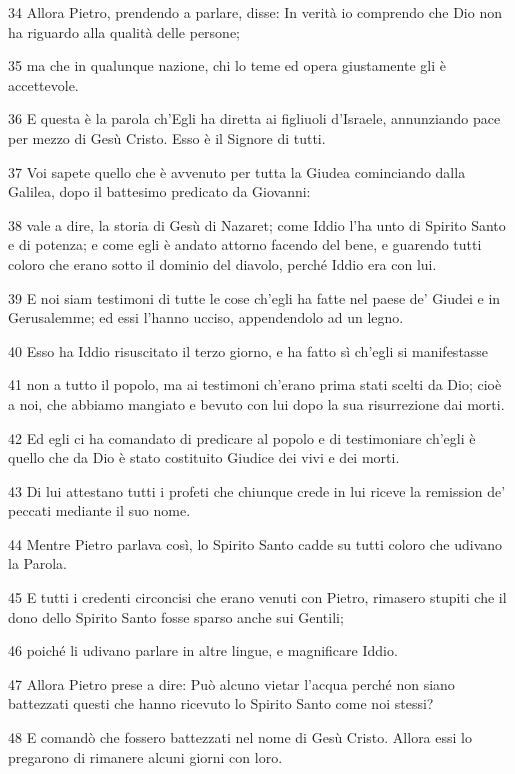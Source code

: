 \par 34 Allora Pietro, prendendo a parlare, disse: In verità io comprendo che Dio non ha riguardo alla qualità delle persone;
\par 35 ma che in qualunque nazione, chi lo teme ed opera giustamente gli è accettevole.
\par 36 E questa è la parola ch'Egli ha diretta ai figliuoli d'Israele, annunziando pace per mezzo di Gesù Cristo. Esso è il Signore di tutti.
\par 37 Voi sapete quello che è avvenuto per tutta la Giudea cominciando dalla Galilea, dopo il battesimo predicato da Giovanni:
\par 38 vale a dire, la storia di Gesù di Nazaret; come Iddio l'ha unto di Spirito Santo e di potenza; e come egli è andato attorno facendo del bene, e guarendo tutti coloro che erano sotto il dominio del diavolo, perché Iddio era con lui.
\par 39 E noi siam testimoni di tutte le cose ch'egli ha fatte nel paese de' Giudei e in Gerusalemme; ed essi l'hanno ucciso, appendendolo ad un legno.
\par 40 Esso ha Iddio risuscitato il terzo giorno, e ha fatto sì ch'egli si manifestasse
\par 41 non a tutto il popolo, ma ai testimoni ch'erano prima stati scelti da Dio; cioè a noi, che abbiamo mangiato e bevuto con lui dopo la sua risurrezione dai morti.
\par 42 Ed egli ci ha comandato di predicare al popolo e di testimoniare ch'egli è quello che da Dio è stato costituito Giudice dei vivi e dei morti.
\par 43 Di lui attestano tutti i profeti che chiunque crede in lui riceve la remission de' peccati mediante il suo nome.
\par 44 Mentre Pietro parlava così, lo Spirito Santo cadde su tutti coloro che udivano la Parola.
\par 45 E tutti i credenti circoncisi che erano venuti con Pietro, rimasero stupiti che il dono dello Spirito Santo fosse sparso anche sui Gentili;
\par 46 poiché li udivano parlare in altre lingue, e magnificare Iddio.
\par 47 Allora Pietro prese a dire: Può alcuno vietar l'acqua perché non siano battezzati questi che hanno ricevuto lo Spirito Santo come noi stessi?
\par 48 E comandò che fossero battezzati nel nome di Gesù Cristo. Allora essi lo pregarono di rimanere alcuni giorni con loro.


